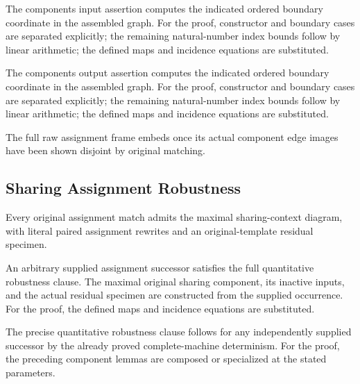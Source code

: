 The components input assertion computes the indicated ordered boundary coordinate in the assembled graph.
For the proof, constructor and boundary cases are separated explicitly; the remaining natural-number index bounds follow by linear arithmetic; the defined maps and incidence equations are substituted.
\par{}

The components output assertion computes the indicated ordered boundary coordinate in the assembled graph.
For the proof, constructor and boundary cases are separated explicitly; the remaining natural-number index bounds follow by linear arithmetic; the defined maps and incidence equations are substituted.
\par{}

The full raw assignment frame embeds once its actual component edge images have been shown disjoint by original matching.
\par{}

\subsection{Sharing Assignment Robustness}
Every original assignment match admits the maximal sharing-context diagram, with literal paired assignment rewrites and an original-template residual specimen.

An arbitrary supplied assignment successor satisfies the full quantitative robustness clause. The maximal original sharing component, its inactive inputs, and the actual residual specimen are constructed from the supplied occurrence.
For the proof, the defined maps and incidence equations are substituted.
\par{}

The precise quantitative robustness clause follows for any independently supplied successor by the already proved complete-machine determinism.
For the proof, the preceding component lemmas are composed or specialized at the stated parameters.
\par{}

